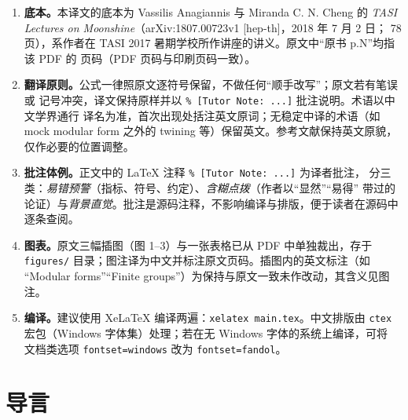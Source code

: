 \documentclass[11pt,a4paper,fontset=windows]{ctexart}
\numberwithin{equation}{section}
\begin{document}
\begin{enumerate}[label=\arabic*.,leftmargin=2.2em,itemsep=3pt]
\item \textbf{底本。}本译文的底本为 Vassilis Anagiannis 与 Miranda C. N. Cheng 的
      \emph{TASI Lectures on Moonshine}（arXiv:1807.00723v1 [hep-th]，2018 年 7 月 2 日；
      78 页），系作者在 TASI 2017 暑期学校所作讲座的讲义。原文中“原书 p.N”均指该 PDF 的
      页码（PDF 页码与印刷页码一致）。

\item \textbf{翻译原则。}公式一律照原文逐符号保留，不做任何“顺手改写”；原文若有笔误或
      记号冲突，译文保持原样并以 \verb|% [Tutor Note: ...]| 批注说明。术语以中文学界通行
      译名为准，首次出现处括注英文原词；无稳定中译的术语（如 mock modular form 之外的
      twining 等）保留英文。参考文献保持英文原貌，仅作必要的位置调整。

\item \textbf{批注体例。}正文中的 LaTeX 注释 \verb|% [Tutor Note: ...]| 为译者批注，
      分三类：\emph{易错预警}（指标、符号、约定）、\emph{含糊点拨}（作者以“显然”“易得”
      带过的论证）与\emph{背景直觉}。批注是源码注释，不影响编译与排版，便于读者在源码中
      逐条查阅。

\item \textbf{图表。}原文三幅插图（图 1--3）与一张表格已从 PDF 中单独裁出，存于
      \verb|figures/| 目录；图注译为中文并标注原文页码。插图内的英文标注（如
      “Modular forms”“Finite groups”）为保持与原文一致未作改动，其含义见图注。

\item \textbf{编译。}建议使用 XeLaTeX 编译两遍：\verb|xelatex main.tex|。中文排版由
      \texttt{ctex} 宏包（Windows 字体集）处理；若在无 Windows 字体的系统上编译，可将
      文档类选项 \verb|fontset=windows| 改为 \verb|fontset=fandol|。
\end{enumerate}

\newpage

\tableofcontents
\newpage


\section*{导言}
\end{document}
